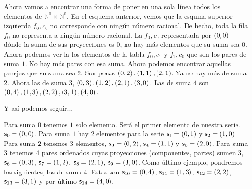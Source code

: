 \documentclass{amsart}
\theoremstyle{definition}
\theoremstyle{remark}
\numberwithin{equation}{section}
\newcommand{\setN}{\mathds N}
\begin{document}
	Ahora vamos a encontrar una forma de poner en una sola línea todos los 
elementos de $\setN^{0}\times\setN^{0}$. En el esquema anterior, vemos que la 
esquina superior izquierda $f_0,c_0$ no corresponde con ningún número
racional. De hecho, toda la fila $f_0$ no representa a ningún número 
racional. La $f_0,c_0$ representada por $\left({{0},{0}}\right)$ dónde la 
suma de sus proyecciones es $0$, no hay más elementos que su
suma sea $0$. Ahora podemos ver la los elementos de la tabla $f_0,c_1$ y
$f_1,c_0$ que son los pares de suma $1$. No hay más pares con esa suma. Ahora 
podemos encontrar aquellas parejas que su suma sea $2$. Son pocas 
$\left({{0},{2}}\right),\left({{1},{1}}\right),\left({{2},{1}}\right)$. Ya 
no hay más de suma $2$. Ahora las de suma $3$,
$\left({{0},{3}}\right),\left({{1},{2}}\right),\left({{2},{1}}\right),\left({{3},{0}}\right)$. Las
de suma $4$ son
$\left({{0},{4}}\right),\left({{1},{3}}\right),\left({{2},{2}}\right),\left({{3},{1}}\right),\left({{4},{0}}\right)$.


	Y así podemos seguir...


	Para suma $0$ tenemos $1$ solo elemento. Será el primer elemento de
nuestra serie. $\textsf{s}_0 = \left({{0},{0}}\right)$. Para suma $1$ hay $2$
elementos para la serie $\textsf{s}_1 = \left({{0},{1}}\right)$ y  $\textsf{s}_2 =
\left({{1},{0}}\right)$.
Para suma $2$ tenemos $3$ elementos, $\textsf{s}_3 = \left({{0},{2}}\right)$,
$\textsf{s}_4 = \left({{1},{1}}\right)$ y $\textsf{s}_5 = \left({{2},{0}}\right)$. Para suma
$3$ tenemos $4$ pares ordenados cuyas proyecciones (componentes, partes) 
sumen $3$, $\textsf{s}_6 = \left({{0},{3}}\right)$,  $\textsf{s}_7 = \left({{1},{2}}\right)$,
$\textsf{s}_8 = \left({{2},{1}}\right)$,  $\textsf{s}_9 = \left({{3},{0}}\right)$. Como
último ejemplo, pondremos los siguientes, los de suma $4$. Estos son
$\textsf{s}_{10} = \left({{0},{4}}\right)$,  $\textsf{s}_{11} = \left({{1},{3}}\right)$,
$\textsf{s}_{12} = \left({{2},{2}}\right)$,  $\textsf{s}_{13} = \left({{3},{1}}\right)$ y por
último $\textsf{s}_{14} = \left({{4},{0}}\right)$.
\end{document}
